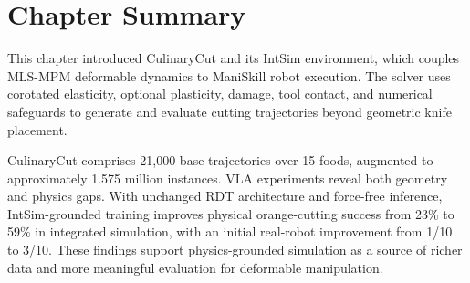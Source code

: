 \FloatBarrier

\section{Chapter Summary}
\label{sec:cut_summary}

This chapter introduced CulinaryCut and its IntSim environment, which couples MLS-MPM deformable dynamics to ManiSkill robot execution. The solver uses corotated elasticity, optional plasticity, damage, tool contact, and numerical safeguards to generate and evaluate cutting trajectories beyond geometric knife placement.

CulinaryCut comprises 21,000 base trajectories over 15 foods, augmented to approximately 1.575 million instances. VLA experiments reveal both geometry and physics gaps. With unchanged RDT architecture and force-free inference, IntSim-grounded training improves physical orange-cutting success from 23\% to 59\% in integrated simulation, with an initial real-robot improvement from 1/10 to 3/10. These findings support physics-grounded simulation as a source of richer data and more meaningful evaluation for deformable manipulation.

\FloatBarrier

